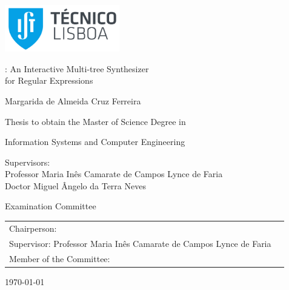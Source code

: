 \thispagestyle {empty}

\includegraphics[width=5cm]{pictures/IST_A.pdf}

\begin{center}

\vspace{2.5cm}
\vspace{1.0cm}
{\FontLb \Forest: An Interactive Multi-tree Synthesizer\\for Regular Expressions}


\vspace{2.7cm}
{\FontMb Margarida de Almeida Cruz Ferreira}

\vspace{2.0cm}
{\FontSn Thesis to obtain the Master of Science Degree in}

\vspace{0.3cm}
{\FontLb Information Systems and Computer Engineering}

\vspace{1.1cm}
{\FontSn %
	Supervisors:\\
	Professor Maria Inês Camarate de Campos Lynce de Faria\\
	Doctor Miguel Ângelo da Terra Neves

}

\vspace{1.1cm}
{\FontMb Examination Committee} \\

\vspace{0.5cm}
{
\FontSn %
\begin{tabular}{ll}
Chairperson: \\
Supervisor: Professor Maria Inês Camarate de Campos Lynce de Faria \\
Member of the Committee: \\
\end{tabular}
}

\vspace{1.5cm}
{\FontMb \monthyeardate\today}

\end{center}

\cleardoublepage

